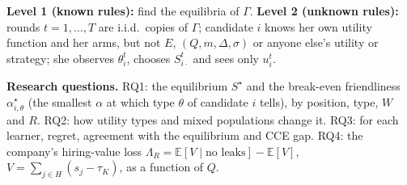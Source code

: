 \documentclass[conference]{IEEEtran}
\theoremstyle{plain}
\theoremstyle{definition}\newtheorem{definition}{Definition}
\newcommand{\E}{\mathbb{E}}\newcommand{\1}{\mathbf{1}}
\begin{document}
\textbf{Level 1 (known rules):} find the equilibria of $\Gamma$. \textbf{Level 2 (unknown rules):} rounds $t=1,\dots,T$ are i.i.d.\ copies
of $\Gamma$; candidate $i$ knows her own utility function and her arms, but not $E$, $(Q,m,\Delta,\sigma)$ or anyone else's utility or
strategy; she observes $\theta_i^t$, chooses $S_{i\cdot}^t$ and sees only $u_i^t$.

\textbf{Research questions.} RQ1: the equilibrium $S^\star$ and the break-even friendliness $\alpha^\star_{i,\theta}$ (the smallest
$\alpha$ at which type $\theta$ of candidate $i$ tells), by position, type, $W$ and $R$. RQ2: how utility types and mixed
populations change it. RQ3: for each learner, regret, agreement with the equilibrium and CCE gap.
RQ4: the company's hiring-value loss $\Lambda_R=\E[V\mid\text{no leaks}]-\E[V]$, $V=\sum_{j\in H}(s_j-\tau_K)$, as a function of $Q$.
\end{document}

